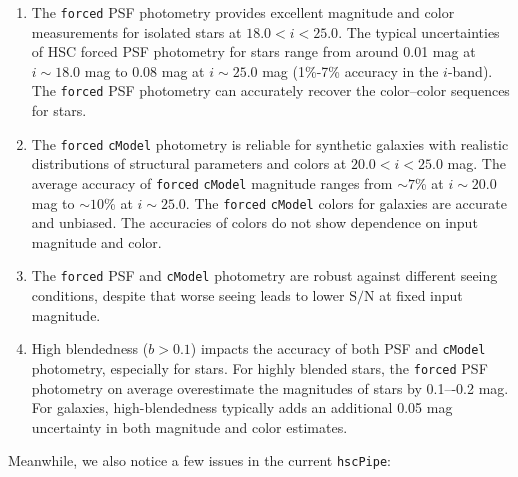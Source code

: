 \documentclass[useamsfonts]{pasj01}
\def\hscpipe{\texttt{hscPipe}}
\def\cmodel{\texttt{cModel}}
\def\forced{\texttt{forced}}
\begin{document}
    \begin{enumerate}
        
        \item The \forced{} PSF photometry provides excellent magnitude and color 
            measurements for isolated stars at $18.0 < i < 25.0$. 
            The typical uncertainties of HSC forced PSF photometry for stars range 
            from around 0.01 mag at $i{\sim}18.0$ mag to 0.08 mag at $i{\sim}25.0$ 
            mag (1\%-7\% accuracy in the $i$-band).            
            The \forced{} PSF photometry can accurately recover the color--color 
            sequences for stars. 
    
        \item The \forced{} \cmodel{} photometry is reliable for synthetic galaxies 
            with realistic distributions of structural parameters and colors at 
            $20.0 < i < 25.0$ mag. 
            The average accuracy of \forced{} \cmodel{} magnitude ranges from 
            ${\sim}7$\% at $i{\sim}20.0$ mag to ${\sim}10$\% at $i{\sim}25.0$. 
            The \forced{} \cmodel{} colors for galaxies are accurate and unbiased. 
            The accuracies of colors do not show dependence on input magnitude and 
            color. 
            
        \item The \forced{} PSF and \cmodel{} photometry are robust against different 
            seeing conditions, despite that worse seeing leads to lower 
            $\mathrm{S}/\mathrm{N}$ at fixed input magnitude. 
            
        \item High blendedness ($b>0.1$) impacts the accuracy of both PSF and \cmodel{}
            photometry, especially for stars.
            For highly blended stars, the \forced{} PSF photometry on average 
            overestimate the magnitudes of stars by 0.1–-0.2 mag. 
            For galaxies, high-blendedness typically adds an additional 0.05 mag 
            uncertainty in both magnitude and color estimates.
           
    \end{enumerate}
    
    Meanwhile, we also notice a few issues in the current \hscpipe{}: 
    
\end{document}

